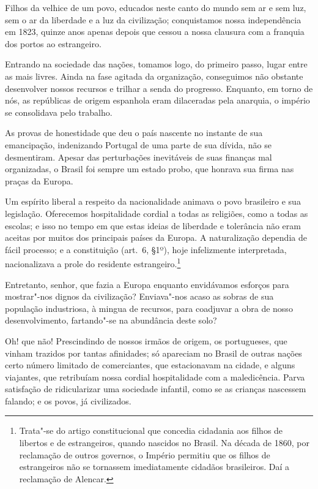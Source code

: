  Filhos da velhice de um povo, educados neste canto do mundo sem ar e
sem luz, sem o ar da liberdade e a luz da civilização; conquistamos
nossa independência em 1823, quinze anos apenas depois que cessou 
a nossa clausura com a franquia dos portos ao estrangeiro.

 Entrando na sociedade das nações, tomamos logo, do primeiro passo,
lugar entre as mais livres. Ainda na fase agitada da organização,
conseguimos não obstante desenvolver nossos recursos e trilhar a senda
do progresso. Enquanto, em torno de nós, as repúblicas de origem
espanhola eram dilaceradas pela anarquia, o império se consolidava pelo trabalho.

 As provas de honestidade que deu o país nascente no instante de sua
emancipação, indenizando Portugal de uma parte de sua dívida, não se
desmentiram. Apesar das perturbações inevitáveis de suas finanças mal
organizadas, o Brasil foi sempre um estado probo, que honrava sua firma
nas praças da Europa. 

 Um espírito liberal a respeito da nacionalidade animava o povo
brasileiro e sua legislação. Oferecemos hospitalidade cordial a todas
as religiões, como a todas as escolas; e isso no tempo em que estas
ideias de liberdade e tolerância não eram aceitas por muitos dos
principais países da Europa. A naturalização dependia de fácil
processo; e a constituição (art.~6, §1º), hoje infelizmente interpretada, 
nacionalizava a prole do residente estrangeiro.\footnote{ Trata"-se do artigo constitucional 
que concedia cidadania aos filhos de libertos e de estrangeiros, quando nascidos no Brasil. 
Na década de 1860, por reclamação de outros governos, o Império permitiu que os filhos de 
estrangeiros não se tornassem imediatamente cidadãos brasileiros. Daí a reclamação de Alencar.}

 Entretanto, senhor, que fazia a Europa enquanto envidávamos esforços
para mostrar"-nos dignos da civilização? Enviava"-nos acaso as sobras
de sua população industriosa, à mingua de recursos, para coadjuvar a
obra de nosso desenvolvimento, fartando"-se na abundância deste solo?

 Oh! que não! Prescindindo de nossos irmãos de origem, os portugueses,
que vinham trazidos por tantas afinidades; só apareciam no Brasil de
outras nações certo número limitado de comerciantes, que estacionavam
na cidade, e alguns viajantes, que retribuíam nossa cordial
hospitalidade com a maledicência. Parva satisfação de ridicularizar uma
sociedade infantil, como se as crianças nascessem falando; e os povos, já civilizados. 

